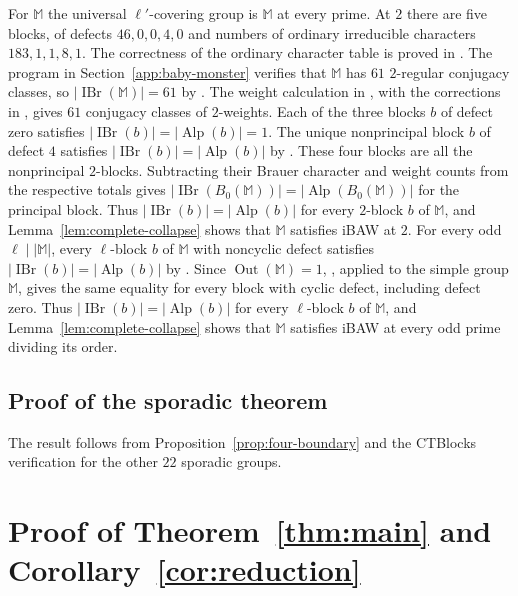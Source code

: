 \documentclass[10pt]{amsart}
\theoremstyle{definition}
\let\oldendproof\endproof
\renewenvironment{proof}[1][\proofname]{%
  \oldproof[\bfseries #1]%
}{\oldendproof}
\DeclareMathOperator{\Out}{Out}
\DeclareMathOperator{\IBr}{IBr}
\DeclareMathOperator{\Alp}{Alp}
\newcommand{\Monster}{\mathbb M}
\numberwithin{equation}{section}
\numberwithin{table}{section}
\begin{document}
\begin{proof}
For $\Monster$ the universal $\ell'$-covering group is $\Monster$ at
every prime.  At $2$ there are five blocks, of defects $46,0,0,4,0$ and
numbers of ordinary irreducible characters $183,1,1,8,1$.  The correctness
of the ordinary character table is proved in
\cite[Section~5]{BreuerMagaardWilsonMonster2026}.
The program in Section~\ref{app:baby-monster} verifies that $\Monster$ has
$61$ $2$-regular conjugacy classes, so $|\IBr(\Monster)|=61$ by
\cite[Corollary~2.10]{Navarro1998}.  The weight calculation in
\cite[proof of Theorem~4.2 and Table~17]{AnDietrich2012}, with the
corrections in \cite{AnDietrichErratum}, gives $61$ conjugacy classes
of $2$-weights.  Each of the three blocks $b$ of defect zero satisfies
$|\IBr(b)|=|\Alp(b)|=1$.  The unique nonprincipal block $b$ of defect $4$ satisfies
$|\IBr(b)|=|\Alp(b)|$ by \cite[Theorem~13.7]{Sambale2014}.  These four blocks are all the nonprincipal $2$-blocks. Subtracting their
Brauer character and weight counts from the respective totals gives
$|\IBr(B_0(\Monster))|=|\Alp(B_0(\Monster))|$ for the principal block.  Thus
$|\IBr(b)|=|\Alp(b)|$ for every $2$-block $b$ of $\Monster$, and
Lemma~\ref{lem:complete-collapse} shows that $\Monster$ satisfies iBAW
at $2$.
For every odd $\ell\mid|\Monster|$, every $\ell$-block $b$ of
$\Monster$ with noncyclic defect satisfies
$|\IBr(b)|=|\Alp(b)|$ by \cite[Theorem~4.4]{AnWilsonMonster}.  Since
$\Out(\Monster)=1$, \cite[Proposition~6.2]{Spath2013}, applied to the
simple group $\Monster$, gives the same equality for every block with
cyclic defect, including defect zero.  Thus
$|\IBr(b)|=|\Alp(b)|$ for every $\ell$-block $b$ of $\Monster$, and
Lemma~\ref{lem:complete-collapse} shows that $\Monster$ satisfies iBAW
at every odd prime dividing its order.
\end{proof}

\subsection{Proof of the sporadic theorem}

\begin{proof}[Proof of Theorem~\ref{thm:sporadic}]
The result follows from Proposition~\ref{prop:four-boundary} and the
CTBlocks verification \cite{BreuerSporadicOverview} for the other
$22$ sporadic groups.
\end{proof}

\section{Proof of Theorem~\ref{thm:main} and
Corollary~\ref{cor:reduction}}
\end{document}
